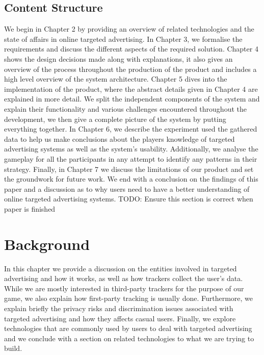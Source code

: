 \documentclass{l4proj}
\begin{document}
\section{Content Structure}
We begin in Chapter 2 by providing an overview of related technologies and the state of affairs in online targeted advertising. In Chapter 3, we formalise the requirements and discuss the different aspects of the required solution. Chapter 4 shows the design decisions made along with explanations, it also gives an overview of the process throughout the production of the product and includes a high level overview of the system architecture. Chapter 5 dives into the implementation of the product, where the abstract details given in Chapter 4 are explained in more detail. We split the independent components of the system and explain their functionality and various challenges encountered throughout the development, we then give a complete picture of the system by putting everything together. In Chapter 6, we describe the experiment used the gathered data to help us make conclusions about the players knowledge of targeted advertising systems as well as the system's usability. Additionally, we analyse the gameplay for all the participants in any attempt to identify any patterns in their strategy. Finally, in Chapter 7 we discuss the limitations of our product and set the groundwork for future work. We end with a conclusion on the findings of this paper and a discussion as to why users need to have a better understanding of online targeted advertising systems.
TODO: Ensure this section is correct when paper is finished

\chapter{Background}
In this chapter we provide a discussion on the entities involved in targeted advertising and how it works, as well as how trackers collect the user's data. While we are mostly interested in third-party trackers for the purpose of our game, we also explain how first-party tracking is usually done. Furthermore, we explain briefly the privacy risks and discrimination issues associated with targeted advertising and how they affects casual users. Finally, we explore technologies that are commonly used by users to deal with targeted advertising and we conclude with a section on related technologies to what we are trying to build.
\end{document}
